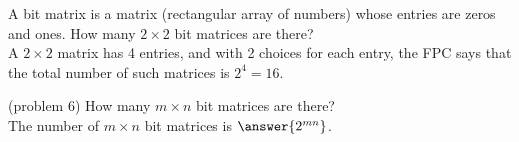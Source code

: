 \documentclass[handout]{ximera}
\begin{document}
\begin{example}[example 6]
A bit matrix is a matrix (rectangular array of numbers) whose entries are zeros and ones. How many $2 \times 2$ bit matrices are there?\\
A $2\times 2$ matrix has 4 entries, and with 2 choices for each entry, the FPC says that the total number of such matrices is $2^4 = 16$.
\end{example}

\begin{problem}(problem 6)
How many $m \times n$ bit matrices are there?\\
The number of $m \times n$ bit matrices is $\answer{2^{mn}}$.
\end{problem}
\end{document}
